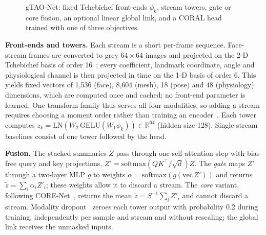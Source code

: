 \begin{figure}[!htbp]
{}
\caption{gTAO-Net: fixed Tchebichef front-ends $\phi_k$, stream towers, gate or core fusion, an optional linear global link, and a CORAL head trained with one of three objectives.}
\label{fig:arch}
\end{figure}

\textbf{Front-ends and towers.} Each stream is a short per-frame sequence. Face-stream frames are converted to grey $64\times64$ images and projected on the 2-D Tchebichef basis of order 16~\cite{mukundan2001tchebichef}; every coefficient, landmark coordinate, angle and physiological channel is then projected in time on the 1-D basis of order 6. This yields fixed vectors of 1{,}536 (face), 8{,}604 (mesh), 18 (pose) and 48 (physiology) dimensions, which are computed once and cached; no front-end parameter is learned. One transform family thus serves all four modalities, so adding a stream requires choosing a moment order rather than training an encoder~\cite{makhkhas2026ordinal}. Each tower computes $z_k=\mathrm{LN}(W_2\,\mathrm{GELU}(W_1\phi_k))\in\mathbb{R}^{64}$ (hidden size 128). Single-stream baselines consist of one tower followed by the head.

\textbf{Fusion.} The stacked summaries $Z$ pass through one self-attention step with bias-free query and key projections, $Z'=\mathrm{softmax}(QK^\top/\sqrt{d})Z$. The \emph{gate} maps $Z'$ through a two-layer MLP $g$ to weights $\alpha=\mathrm{softmax}(g(\mathrm{vec}\,Z'))$ and returns $\tilde z=\sum_i\alpha_iZ'_i$; these weights allow it to discard a stream. The \emph{core} variant, following CORE-Net~\cite{tran2026ordinal}, returns the mean $\tilde z=S^{-1}\sum_iZ'_i$ and cannot discard a stream. Modality dropout~\cite{neverova2016moddrop} zeroes each tower output with probability 0.2 during training, independently per sample and stream and without rescaling; the global link receives the unmasked inputs.

